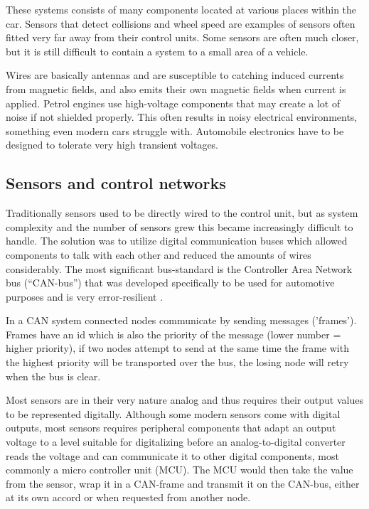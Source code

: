 These systems consists of many components located at various places within the
car. Sensors that detect collisions and wheel speed are examples of sensors
often fitted very far away from their control units. Some sensors are often
much closer, but it is still difficult to contain a system to a small area of a
vehicle.

Wires are basically antennas and are susceptible to catching induced currents
from magnetic fields, and also emits their own magnetic fields when current is
applied. Petrol engines use high-voltage components that may create a lot of
noise if not shielded properly. This often results in noisy electrical
environments, something even modern cars struggle with. Automobile electronics
have to be designed to tolerate very high transient voltages. 

\subsection{Sensors and control networks}
Traditionally sensors used to be directly wired to the control unit, but as
system complexity and the
number of sensors grew this became increasingly difficult to handle. The
solution was to utilize digital communication buses which allowed components to talk with each other and reduced the amounts of wires considerably. The most significant bus-standard is the Controller Area Network bus
(``CAN-bus'')
that was developed specifically to be used for automotive purposes and is
very error-resilient \cite{can-appnote}.

In a CAN system connected nodes communicate by sending messages ('frames').
Frames have an id which is also the priority of the message (lower number =
higher priority), if two nodes attempt to send at the same time the frame
with the highest priority will be transported over the bus, the losing node
will retry when the bus is clear. \cite{can-appnote}

Most sensors are in their very nature analog and thus requires their output
values to be represented digitally. Although some modern sensors come with
digital outputs, most sensors requires peripheral components that adapt an
output voltage to a level suitable for digitalizing before an analog-to-digital
converter reads the voltage and can communicate it to other digital components,
most commonly a micro controller unit (MCU). The MCU would then take the value
from the sensor, wrap it in a CAN-frame and transmit it on the
CAN-bus, either at its own accord or when requested from another node. \cite[loc. 5020-5203,
5732-7565]{catsoulis:embedded}\cite{can-appnote}

